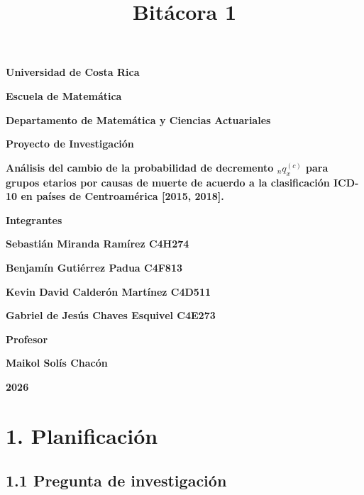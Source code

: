 \documentclass[
  letterpaper,
  DIV=11,
  numbers=noendperiod]{scrartcl}
\title{Bitácora 1}
\author{}
\date{}
\begin{document}
\maketitle


\begin{center}

\textbf{Universidad de Costa Rica}


\vspace{0.5cm}

\textbf{Escuela de Matemática}

\textbf{Departamento de Matemática y Ciencias Actuariales}

\vspace{0.5cm}

\textbf{Proyecto de Investigación}

\textbf{Análisis del cambio de la probabilidad de decremento ${}_{n}q_{x}^{(c)}$  para grupos etarios por  causas de muerte de acuerdo a la clasificación ICD-10 en países de Centroamérica [2015, 2018].}

\vspace{0.5cm}

\textbf{Integrantes}

\textbf{Sebastián Miranda Ramírez  C4H274 }

\textbf{Benjamín Gutiérrez Padua  C4F813}

\textbf{Kevin David Calderón Martínez  C4D511}

\textbf{Gabriel de Jesús Chaves Esquivel  C4E273}

\vspace{0.5cm}

\textbf{Profesor}

\textbf{Maikol Solís Chacón} 

\vspace{0.5cm}

\textbf{2026}


\end{center}

\newpage

\section{1. Planificación}\label{planificaciuxf3n}

\subsection{1.1 Pregunta de
investigación}\label{pregunta-de-investigaciuxf3n}
\end{document}
